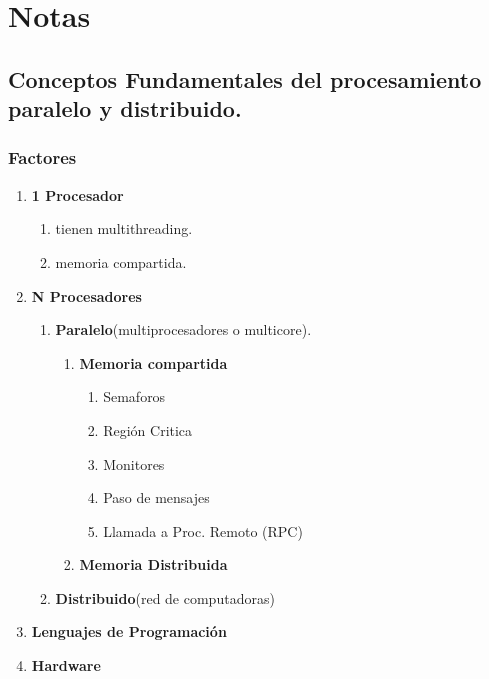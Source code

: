 \documentclass[12pt]{article}
\begin{document}

{\color{blue} \section*{\textbf{Notas}}}
\vspace{1em}

{\color{blue} \subsection*{\textbf{Conceptos Fundamentales del procesamiento paralelo y distribuido.}}}

\subsubsection*{\textbf{Factores}}
\begin{enumerate}
    \item \textbf{1 Procesador}
    \begin{enumerate}
        \item tienen multithreading.
        \item memoria compartida.
    \end{enumerate}
    \item \textbf{N Procesadores} 
    \begin{enumerate}
        \item \textbf{Paralelo}(multiprocesadores o multicore).
        \begin{enumerate}
            \item \textbf{Memoria compartida}
            \begin{enumerate}
                \item Semaforos
                \item Región Critica
                \item Monitores
                \item Paso de mensajes
                \item Llamada a Proc. Remoto (RPC)
            \end{enumerate}
            \item \textbf{Memoria Distribuida}
        \end{enumerate}
        \item \textbf{Distribuido}(red de computadoras) 
    \end{enumerate}
    \item \textbf{Lenguajes de Programación}
    \item \textbf{Hardware}
\end{enumerate}
\vspace{-0.5em}
\end{document}
